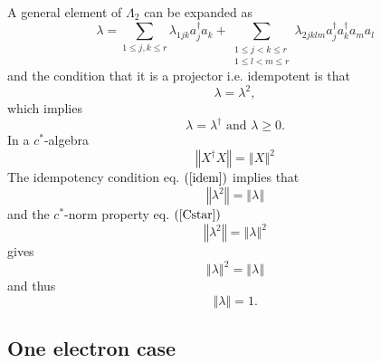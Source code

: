 \documentclass[aps,preprint]{revtex4}%
\begin{document}
A general element of $\Lambda_{2}$ can be expanded as
\begin{equation}
\lambda=\sum_{1\leq j,k\leq r}\lambda_{1jk}a_{j}^{\dagger}a_{k}+\sum
_{\substack{1\leq j<k\leq r\\1\leq l<m\leq r}}\lambda_{2jklm}a_{j}^{\dagger
}a_{k}^{\dagger}a_{m}a_{l}%
\end{equation}
and the condition that it is a projector i.e. idempotent is that%
\begin{equation}
\lambda=\lambda^{2}, \label{idem}%
\end{equation}
which implies
\begin{equation}
\lambda=\lambda^{\dagger}\text{ and }\lambda\geq0.
\end{equation}
In a $c^{\ast}$-algebra
\begin{equation}
\left\Vert X^{\dagger}X\right\Vert =\left\Vert X\right\Vert ^{2} \label{Cstar}%
\end{equation}
The idempotency condition eq. $\left(  \ref{idem}\right)  $ implies that
\begin{equation}
\left\Vert \lambda^{2}\right\Vert =\left\Vert \lambda\right\Vert
\end{equation}
and the $c^{\ast}$-norm property eq. $\left(  \ref{Cstar}\right)  $%
\begin{equation}
\left\Vert \lambda^{2}\right\Vert =\left\Vert \lambda\right\Vert ^{2}%
\end{equation}
gives
\begin{equation}
\left\Vert \lambda\right\Vert ^{2}=\left\Vert \lambda\right\Vert
\end{equation}
and thus
\begin{equation}
\left\Vert \lambda\right\Vert =1.
\end{equation}


\subsection{One electron case}
\end{document}
